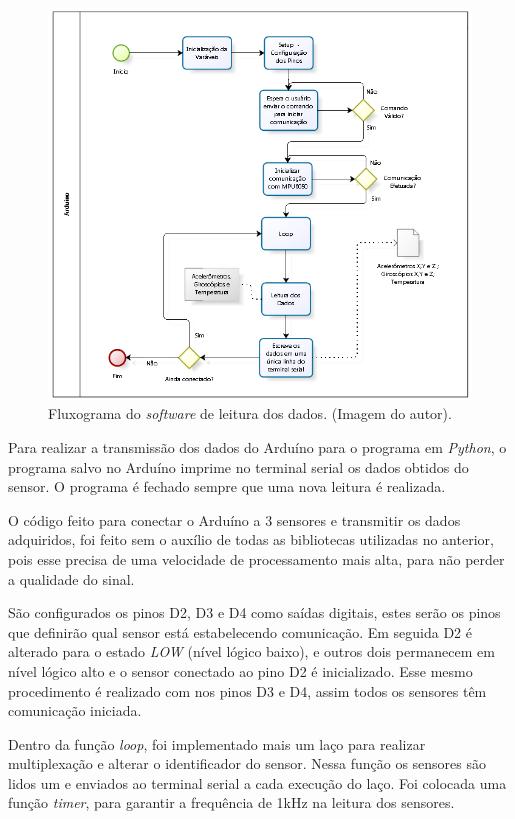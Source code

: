 		\begin{figure}[h!]
			\centering
			\includegraphics[keepaspectratio=true,scale=0.9]{figuras/diagrama_embarcado.PNG}
			\caption{Fluxograma do \textit{software} de leitura dos dados. (Imagem do autor).} 
			\label{fluxograma_arduino}	
		\end{figure}
		
		Para realizar a transmissão dos dados do Arduíno para o programa em \textit{Python}, o programa salvo no Arduíno imprime no terminal serial os dados obtidos do sensor. O programa é fechado sempre que uma nova leitura é realizada.
		
		O código feito para conectar o Arduíno a 3 sensores e transmitir os dados adquiridos, foi feito sem o auxílio de todas as bibliotecas utilizadas no anterior, pois esse precisa de uma velocidade de processamento mais alta, para não perder a qualidade do sinal. 
		
		São configurados os pinos D2, D3 e D4 como saídas digitais, estes serão os pinos que definirão qual sensor está estabelecendo comunicação. Em seguida D2 é alterado para o estado \textit{LOW } (nível lógico baixo), e outros dois permanecem em nível lógico alto e o sensor conectado ao pino D2 é inicializado. Esse mesmo procedimento é realizado com nos pinos D3 e D4, assim todos os sensores têm comunicação iniciada.
		
		Dentro da função \textit{loop}, foi implementado mais um laço  para realizar multiplexação e alterar o identificador do sensor. Nessa função os sensores são lidos um e enviados ao terminal serial a cada execução do laço. Foi colocada uma função \textit{timer}, para garantir a frequência de 1kHz na leitura dos sensores.

